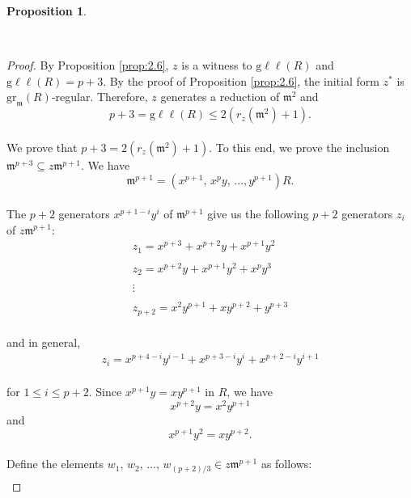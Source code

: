 \documentclass{amsart}
\newtheorem{proposition}[theorem]{Proposition}
\theoremstyle{definition}
\theoremstyle{definition}
\numberwithin{equation}{section}
\theoremstyle{definition}
\begin{document}
{\begin{proposition}
\end{proposition}
\text{}\\
\begin{proof}
By Proposition \ref{prop:2.6}, $z$ is a witness to $\text{g}\ell\ell(R)$ and $\text{g}\ell\ell(R)=p+3$. By the proof of Proposition \ref{prop:2.6}, the initial form $z^*$ is $\text{gr}_{\mathfrak{m}}(R)$-regular. Therefore, $z$ generates a reduction of $\mathfrak{m}^2$ and \\
\begin{equation*}\label{equation:1}
p+3=\text{g}\ell\ell(R) \leq 2 \left(r_{z}(\mathfrak{m}^2) + 1 \right).
\end{equation*}\text{}\\
We prove that $p+3=2\left(r_{z}(\mathfrak{m}^2) + 1 \right)$. To this end, we prove the inclusion $\mathfrak{m}^{p+3} \subseteq z \mathfrak{m}^{p+1}$. We have 
\[
\mathfrak{m}^{p+1}=\left(x^{p+1},\, x^p y, \, \dots, y^{p+1} \right)R.
\] \text{}\\ The $p+2$ generators $x^{p+1-i}y^i$ of $\mathfrak{m}^{p+1}$ give us the following $p+2$ generators $z_i$ of $z\mathfrak{m}^{p+1}$:\\
\begin{align*}
&z_1 = x^{p+3} + x^{p+2}y + x^{p+1}y^2&\\\\
&z_2 = x^{p+2}y + x^{p+1}y^2 + x^{p}y^3&\\\\
&\vdots& \\\\
&z_{p+2}=x^2 y^{p+1} +xy^{p+2} + y^{p+3}&
\end{align*} \text{}\\ and in general, 
\begin{align*}
&z_i=x^{p+4-i}y^{i-1} + x^{p+3-i}y^{i} + x^{p+2-i}y^{i+1}&
\end{align*}\text{}\\ 
for $1 \leq i \leq p+2$. Since $x^{p+1} y= xy^{p+1}$ in $R$, we have \\ 
\begin{equation}\label{equation:2.1}
x^{p+2}y=x^2y^{p+1}
\end{equation} and 
\begin{equation}\label{equation:2.2}
x^{p+1}y^2 = xy^{p+2}.
\end{equation} \text{}\\ Define the elements $w_1, \, w_2, \, \dots, \, w_{(p+2)/3} \in z\mathfrak{m}^{p+1}$ as follows: \\
\begin{align*}

\end{align*}
\end{proof}}
\end{document}
